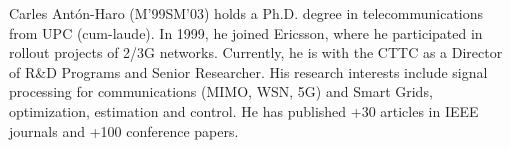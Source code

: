 \documentclass[journal]{IEEEtran}
\begin{document}
\vspace{-0.7cm}
\begin{IEEEbiographynophoto}{Carles Ant\'on-Haro (M'99\textendash SM'03)}
holds a Ph.D. degree in telecommunications from UPC (cum-laude). In 1999, he joined Ericsson, where he participated in rollout projects of 2/3G networks. Currently, he is with the CTTC as a Director of R\&D Programs and Senior Researcher. His research interests include signal processing for communications (MIMO, WSN, 5G) and Smart Grids, optimization, estimation and control. He has published +30 articles in IEEE journals and +100 conference papers.
\end{IEEEbiographynophoto}

\vfill
\vfill
\end{document}
